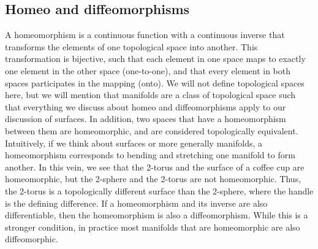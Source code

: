 \begin{appendices}
\section{Homeo and diffeomorphisms}
A homeomorphism is a continuous function with a continuous inverse that transforms the elements of one topological space into another. This transformation is bijective, such that each element in one space maps to exactly one element in the other space (one-to-one), and that every element in both spaces participates in the mapping (onto).
We will not define topological spaces here, but we will mention that manifolds are a class of topological space such that everything we discuss about homeo and diffeomorphisms apply to our discussion of surfaces.
In addition, two spaces that have a homeomorphism between them are homeomorphic, and are considered topologically equivalent. \\

Intuitively, if we think about surfaces or more generally manifolds, a homeomorphism corresponds to bending and stretching one manifold to form another.
In this vein, we see that the 2-torus and the surface of a coffee cup are homeomorphic, but the 2-sphere and the 2-torus are not homeomorphic. 
Thus, the 2-torus is a topologically different surface than the 2-sphere, where the handle is the defining difference.
If a homeomorphism and its inverse are also differentiable, then the homeomorphism is also a diffeomorphism.
While this is a stronger condition, in practice most manifolds that are homeomorphic are also diffeomorphic.
\end{appendices}
